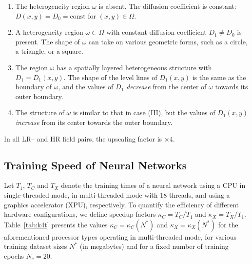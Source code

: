 \documentclass{ieeeaccess}
\begin{document}
\begin{enumerate}
    \item The heterogeneity region $\omega$ is absent. The diffusion coefficient is constant: $D(x,y) = D_0 = \mathrm{const}$ for $(x, y) \in \Omega$.
    
    \item A heterogeneity region $\omega \subset \Omega$ with constant diffusion coefficient $D_1 \ne D_0$ is present. The shape of $\omega$ can take on various geometric forms, such as a circle, a triangle, or a square.
    
    \item The region $\omega$ has a spatially layered heterogeneous structure with  $D_1 = D_1(x,y)$. The shape of the level lines of $D_1(x,y)$ is the same as the boundary of $\omega$, and the values of $D_1$ \textit{decrease} from the center of $\omega$ towards its outer boundary.
    
    \item The structure of $\omega$ is similar to that in case (III), but the values of $D_1(x,y)$ \textit{increase} from its center towards the outer boundary.
\end{enumerate}

In all LR– and HR field pairs, the upscaling factor is $\times4$.


\subsection{Training Speed of Neural Networks}

Let $T_1$, $T_C$ and $T_X$ denote the training times of a neural network using a CPU in single-threaded mode, in multi-threaded mode with 18 threads, and using a graphics accelerator (XPU), respectively. 
To quantify the efficiency of different hardware configurations, we define speedup factors $\kappa_C = T_C / T_1$ and $\kappa_X = T_X / T_1$. Table~\ref{tab:k4t} presents the values $\kappa_C = \kappa_C(N^*)$ and $\kappa_X = \kappa_X(N^*)$ for the aforementioned processor types operating in multi-threaded mode, for various training dataset sizes $N^*$ (in megabytes) and for a fixed number of training epochs $N_e = 20$.
\end{document}

